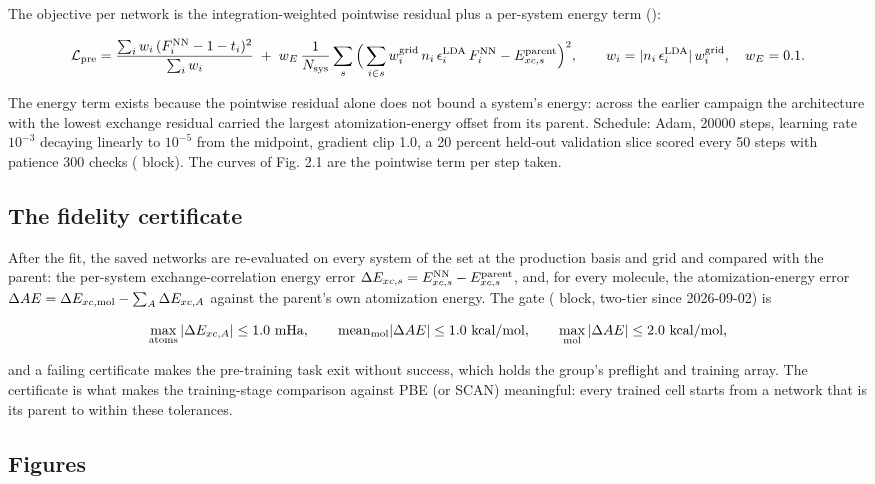 \documentclass[10pt,a4paper]{article}
\begin{document}
The objective per network is the integration-weighted pointwise residual plus a per-system
energy term ():

\[
\mathcal{L}_{\rm pre} = \frac{\sum_i w_i\,(F_i^{\rm NN} - 1 - t_i)^2}{\sum_i w_i}
\;+\; w_E\,\frac{1}{N_{\rm sys}}\sum_{s}\Big(\sum_{i\in s} w^{\rm grid}_i\, n_i\,\epsilon_i^{\rm LDA}\, F_i^{\rm NN} - E_{xc,s}^{\rm parent}\Big)^2,
\qquad w_i = |n_i\, \epsilon_i^{\rm LDA}|\, w_i^{\rm grid}, \quad w_E = 0.1 .
\]

The energy term exists because the pointwise residual alone does not bound a system's energy:
across the earlier campaign the architecture with the lowest exchange residual carried the
largest atomization-energy offset from its parent. Schedule: Adam, 20000 steps, learning rate
$10^{-3}$ decaying linearly to $10^{-5}$ from the midpoint, gradient clip 1.0, a 20 percent
held-out validation slice scored every 50 steps with patience 300 checks ( block).
The curves of Fig. 2.1 are the pointwise term per step taken.

\subsection{The fidelity certificate}

After the fit, the saved networks are re-evaluated on every system of the set at the production
basis and grid and compared with the parent: the per-system exchange-correlation energy error
$\Delta E_{xc,s} = E_{xc,s}^{\rm NN} - E_{xc,s}^{\rm parent}$, and, for every molecule, the
atomization-energy error $\Delta AE = \Delta E_{xc,{\rm mol}} - \sum_A \Delta E_{xc,A}$ against
the parent's own atomization energy. The gate ( block, two-tier since 2026-09-02) is

\[
\max_{\rm atoms} |\Delta E_{xc,A}| \le 1.0\ \text{mHa}, \qquad
\mathrm{mean}_{\rm mol} |\Delta AE| \le 1.0\ \text{kcal/mol}, \qquad
\max_{\rm mol} |\Delta AE| \le 2.0\ \text{kcal/mol},
\]

and a failing certificate makes the pre-training task exit without success, which holds the
group's preflight and training array. The certificate is what makes the training-stage
comparison against PBE (or SCAN) meaningful: every trained cell starts from a network that is
its parent to within these tolerances.

\subsection{Figures}
\end{document}

